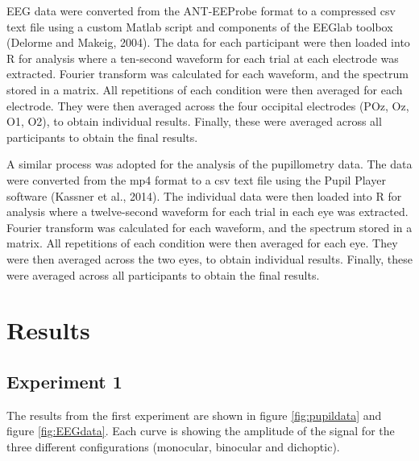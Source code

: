 \documentclass[
]{article}
\begin{document}
EEG data were converted from the ANT-EEProbe format to a compressed csv text file using a custom Matlab script and components of the EEGlab toolbox (Delorme and Makeig, 2004). The data for each participant were then loaded into R for analysis where a ten-second waveform for each trial at each electrode was extracted. Fourier transform was calculated for each waveform, and the spectrum stored in a matrix. All repetitions of each condition were then averaged for each electrode. They were then averaged across the four occipital electrodes (POz, Oz, O1, O2), to obtain individual results. Finally, these were averaged across all participants to obtain the final results.

A similar process was adopted for the analysis of the pupillometry data. The data were converted from the mp4 format to a csv text file using the Pupil Player software (Kassner et al., 2014). The individual data were then loaded into R for analysis where a twelve-second waveform for each trial in each eye was extracted. Fourier transform was calculated for each waveform, and the spectrum stored in a matrix. All repetitions of each condition were then averaged for each eye. They were then averaged across the two eyes, to obtain individual results. Finally, these were averaged across all participants to obtain the final results.

\hypertarget{results}{%
\section{Results}\label{results}}

\hypertarget{experiment-1-1}{%
\subsection{Experiment 1}\label{experiment-1-1}}

The results from the first experiment are shown in figure \ref{fig:pupildata} and figure \ref{fig:EEGdata}. Each curve is showing the amplitude of the signal for the three different configurations (monocular, binocular and dichoptic).
\end{document}
